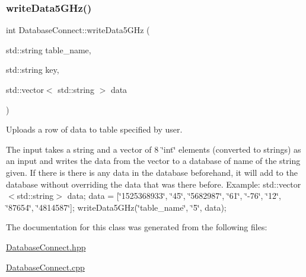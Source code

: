 \subsubsection{\texorpdfstring{write\+Data5\+G\+Hz()}{writeData5GHz()}}
{\footnotesize\ttfamily int Database\+Connect\+::write\+Data5\+G\+Hz (\begin{DoxyParamCaption}\item[{std\+::string}]{table\+\_\+name,  }\item[{std\+::string}]{key,  }\item[{std\+::vector$<$ std\+::string $>$}]{data }\end{DoxyParamCaption})}



Uploads a row of data to table specified by user. 

The input takes a string and a vector of 8 \char`\"{}int\char`\"{} elements (converted to strings) as an input and writes the data from the vector to a database of name of the string given. If there is there is any data in the database beforehand, it will add to the database without overriding the data that was there before. Example\+: std\+::vector$<$std\+::string$>$ data; data = \mbox{[}\char`\"{}1525368933\char`\"{}, \char`\"{}45\char`\"{}, \char`\"{}5682987\char`\"{}, \char`\"{}61\char`\"{}, \char`\"{}-\/76\char`\"{}, \char`\"{}12\char`\"{}, \char`\"{}87654\char`\"{}, \char`\"{}4814587\char`\"{}\mbox{]}; write\+Data5\+G\+Hz(\char`\"{}table\+\_\+name\char`\"{}, \char`\"{}5\char`\"{}, data); 

The documentation for this class was generated from the following files\+:\begin{DoxyCompactItemize}
\item 
\mbox{\hyperlink{DatabaseConnect_8hpp}{Database\+Connect.\+hpp}}\item 
\mbox{\hyperlink{DatabaseConnect_8cpp}{Database\+Connect.\+cpp}}\end{DoxyCompactItemize}
